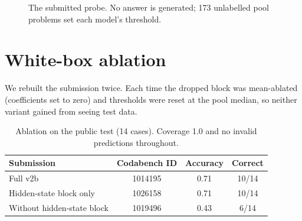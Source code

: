 \documentclass{article}
\begin{document}
\begin{figure}[t]
\centering
{}
\caption{The submitted probe. No answer is generated; 173 unlabelled pool problems set each model's threshold.}
\label{fig:pipeline}
\end{figure}

\section{White-box ablation}
\label{sec:ablation}

We rebuilt the submission twice. Each time the dropped block was mean-ablated (coefficients set to zero) and thresholds were reset at the pool median, so neither variant gained from seeing test data.

\begin{table}[h]
\centering
\caption{Ablation on the public test (14 cases). Coverage 1.0 and no invalid predictions throughout.}
\label{tab:ablation}
\begin{tabular}{lccc}
\toprule
Submission & Codabench ID & Accuracy & Correct \\
\midrule
Full v2b & 1014195 & 0.71 & 10/14 \\
Hidden-state block only & 1026158 & 0.71 & 10/14 \\
Without hidden-state block & 1019496 & 0.43 & 6/14 \\
\bottomrule
\end{tabular}
\end{table}
\end{document}
